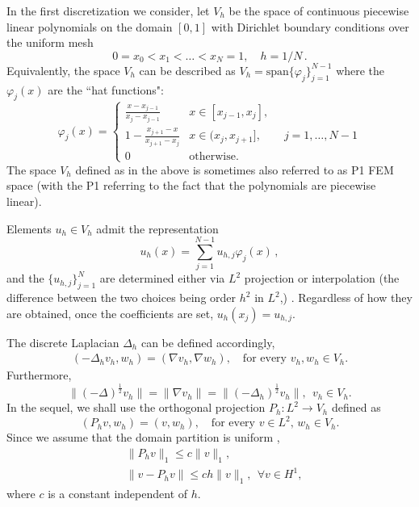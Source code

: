\documentclass[reqno, 11pt]{amsart}
\theoremstyle{plain}
\theoremstyle{definition}
\theoremstyle{remark}
\numberwithin{equation}{section}
\numberwithin{theorem}{section}
\begin{document}
{In the first discretization we consider, let  $V_h$ be the space of continuous piecewise linear polynomials on the domain $[0,1]$ with Dirichlet boundary conditions over the uniform mesh
\begin{equation}
\label{e:femmesh}
    0=x_0<x_1<\ldots<x_{N} = 1, \quad h = 1/N \,.
\end{equation}
Equivalently, the space $V_h$ can be described as $V_h = \mathrm{span}\{\varphi_j\}_{j=1}^{N-1}$ where the $\varphi_j(x)$  are the ``hat functions":
\begin{equation}
\label{e:hatfunction}
    \varphi_j(x) = \begin{cases} \frac{x-x_{j-1}}{x_j - x_{j-1}}& x\in [x_{j-1}, x_j],\\
    1 - \frac{x_{j+1} - x}{x_{j+1} - x_{j}}& x\in (x_{j}, x_{j+1}], \qquad j=1, \dots, N-1 \\
    0 & \text{otherwise.}
    \end{cases}
\end{equation}
The space $V_h$ defined as in the above is sometimes also referred to as P1 FEM space (with the P1 referring to the fact that the polynomials are piecewise linear).  

Elements $u_h\in V_h$  admit the representation
\begin{equation}
    \label{e:FEM}
    u_h(x) = \sum_{j=1}^{N-1} u_{h,j} \varphi_j(x)\,,
\end{equation}
and the $\{u_{h,j}\}_{j=1}^N$ are determined either via $L^2$  projection or interpolation (the difference between the two choices being order $h^2$ in $L^2$,\cite{Brenner}) .  Regardless of how they are obtained, once the coefficients are set, $u_h(x_j) = u_{h,j}$.


The discrete Laplacian $\Delta_h$ can be defined accordingly,
\begin{align}\label{def:dislap}
(-\Delta_h v_h, w_h)=(\nabla v_h, \nabla w_h), \quad \mbox{for every } v_h, w_h\in V_h.
\end{align}
Furthermore,
$$
\|(-\Delta)^{\frac{1}{2}}v_h\|=\|\nabla v_h\|=\|(-\Delta_h)^{\frac{1}{2}}v_h\|, \ \ v_h\in V_h.
$$
In the sequel, we shall use the  orthogonal projection $P_h: L^2\to V_h$ defined as 
$$
(P_hv, w_h)=(v, w_h), \quad \mbox{for every } v\in L^2, \, w_h\in V_h. 
$$
Since we assume that the domain partition is uniform \cite{QuarteroniV97},
\begin{align}
&\|P_hv\|_1\leq c\|v\|_1, \\
&\|v-P_hv\|\leq ch\|v\|_1,\  \ \forall v\in H^1,
\end{align}
where $c$ is a constant independent of $h$. 



}
\end{document}
